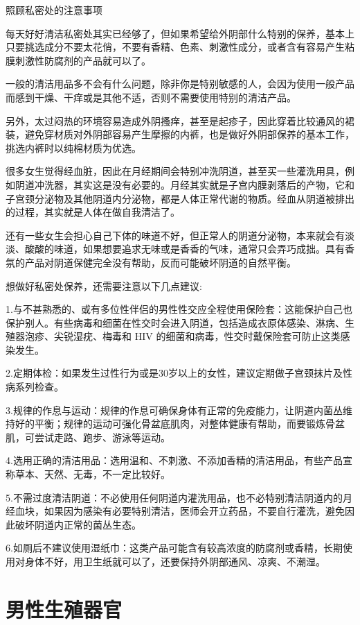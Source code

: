 \documentclass[12pt,UTF8]{ctexbook}
\begin{document}
照顾私密处的注意事项

每天好好清洁私密处其实已经够了，但如果希望给外阴部什么特别的保养，基本上只要挑选成分不要太花俏，不要有香精、色素、刺激性成分，或者含有容易产生粘膜刺激性防腐剂的产品就可以了。

一般的清洁用品多不会有什么问题，除非你是特别敏感的人，会因为使用一般产品而感到干燥、干痒或是其他不适，否则不需要使用特别的清洁产品。

另外，太过闷热的环境容易造成外阴搔痒，甚至是起疹子，因此穿着比较通风的裙装，避免穿材质对外阴部容易产生摩擦的内裤，也是做好外阴部保养的基本工作，挑选内裤时以纯棉材质为优选。

很多女生觉得经血脏，因此在月经期间会特别冲洗阴道，甚至买一些灌洗用具，例如阴道冲洗器，其实这是没有必要的。月经其实就是子宫内膜剥落后的产物，它和子宫颈分泌物及其他阴道内分泌物，都是人体正常代谢的物质。经血从阴道被排出的过程，其实就是人体在做自我清洁了。

还有一些女生会担心自己下体的味道不好，但正常人的阴道分泌物，本来就会有淡淡、酸酸的味道，如果想要追求无味或是香香的气味，通常只会弄巧成拙。具有香氛的产品对阴道保健完全没有帮助，反而可能破坏阴道的自然平衡。

想做好私密处保养，还需要注意以下几点建议:

1.与不甚熟悉的、或有多位性伴侣的男性性交应全程使用保险套：这能保护自己也保护别人。有些病毒和细菌在性交时会进入阴道，包括造成衣原体感染、淋病、生殖器泡疹、尖锐湿疣、梅毒和 HIV 的细菌和病毒，性交时戴保险套可防止这类感染发生。

2.定期体检：如果发生过性行为或是30岁以上的女性，建议定期做子宫颈抹片及性病系列检查。

3.规律的作息与运动：规律的作息可确保身体有正常的免疫能力，让阴道内菌丛维持好的平衡；规律的运动可强化骨盆底肌肉，对整体健康有帮助，而要锻炼骨盆肌，可尝试走路、跑步、游泳等运动。

4.选用正确的清洁用品：选用温和、不刺激、不添加香精的清洁用品，有些产品宣称草本、天然、无毒，不一定比较好。

5.不需过度清洁阴道：不必使用任何阴道内灌洗用品，也不必特别清洁阴道内的月经血块，如果因为感染有必要特别清洁，医师会开立药品，不要自行灌洗，避免因此破坏阴道内正常的菌丛生态。

6.如厕后不建议使用湿纸巾：这类产品可能含有较高浓度的防腐剂或香精，长期使用对身体不好，用卫生纸就可以了，还要保持外阴部通风、凉爽、不潮湿。

\chapter{男性生殖器官}
\end{document}
